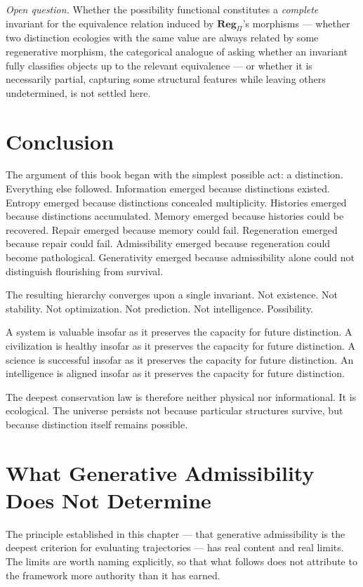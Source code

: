 \documentclass[12pt,twoside,openright]{book}
\begin{document}
\emph{Open question.} Whether the possibility functional
constitutes a \emph{complete} invariant for the equivalence
relation induced by $\mathbf{Reg}_\Pi$'s morphisms --- whether two
distinction ecologies with the same value are always related by
some regenerative morphism, the categorical analogue of asking
whether an invariant fully classifies objects up to the relevant
equivalence --- or whether it is necessarily partial, capturing
some structural features while leaving others undetermined, is
not settled here.

\section{Conclusion}
\label{sec:ch31-conclusion}

The argument of this book began with the simplest possible
act: a distinction. Everything else followed. Information
emerged because distinctions existed. Entropy emerged
because distinctions concealed multiplicity. Histories
emerged because distinctions accumulated. Memory emerged
because histories could be recovered. Repair emerged because
memory could fail. Regeneration emerged because repair could
fail. Admissibility emerged because regeneration could
become pathological. Generativity emerged because
admissibility alone could not distinguish flourishing from
survival.

The resulting hierarchy converges upon a single invariant.
Not existence. Not stability. Not optimization. Not
prediction. Not intelligence. Possibility.

A system is valuable insofar as it preserves the capacity
for future distinction. A civilization is healthy insofar as
it preserves the capacity for future distinction. A science
is successful insofar as it preserves the capacity for
future distinction. An intelligence is aligned insofar as it
preserves the capacity for future distinction.

The deepest conservation law is therefore neither physical
nor informational. It is ecological. The universe persists
not because particular structures survive, but because
distinction itself remains possible.

\section{What Generative Admissibility Does Not Determine}
\label{sec:ch31-limits}

The principle established in this chapter --- that
generative admissibility is the deepest criterion for
evaluating trajectories --- has real content and real
limits. The limits are worth naming explicitly, so that
what follows does not attribute to the framework more
authority than it has earned.
\end{document}
